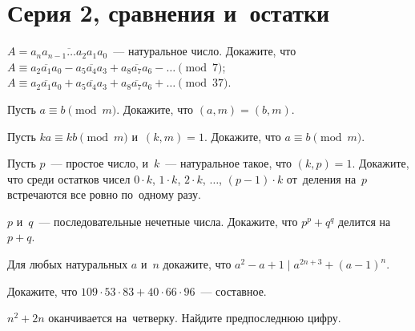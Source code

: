 

\section*{Серия 2, сравнения и~остатки}


\begin{problems}

\item
$A = \overline{a_n a_{n-1} \ldots a_2 a_1 a_0}$~--- натуральное число.
Докажите, что
\\
\sbp
\(
    A
\equiv
    \overline{a_2 a_1 a_0} - \overline{a_5 a_4 a_3} +
    \overline{a_8 a_7 a_6} - \ldots
    \pmod{7}
\);
\\
\sbp
\(
    A
\equiv
    \overline{a_2 a_1 a_0} + \overline{a_5 a_4 a_3} +
    \overline{a_8 a_7 a_6} + \ldots
    \pmod{37}
\).

\item
Пусть $a \equiv b \pmod{m}$.
Докажите, что $(a, m) = (b, m)$.

\item
Пусть $k a \equiv k b \pmod m$ и~$(k, m) = 1$.
Докажите, что $a \equiv b \pmod{m}$.

\item
Пусть $p$~--- простое число, и~$k$~--- натуральное такое, что $(k, p) = 1$.
Докажите, что среди остатков чисел
$0 \cdot k$, $1 \cdot k$, $2 \cdot k$, $\ldots$, $(p-1) \cdot k$
от~деления на~$p$ встречаются все ровно по~одному разу.

\item
$p$ и~$q$~--- последовательные нечетные числа.
Докажите, что $p^p + q^q$ делится на~$p + q$.

\item
Для любых натуральных $a$ и~$n$ докажите, что
$a^2 - a + 1 \mid a^{2 n + 3} + (a - 1)^n$.

\item
Докажите, что $109 \cdot 53 \cdot 83 + 40 \cdot 66 \cdot 96$~--- составное.

\item
$n^2 + 2 n$ оканчивается на~четверку.
Найдите предпоследнюю цифру.

\end{problems}


